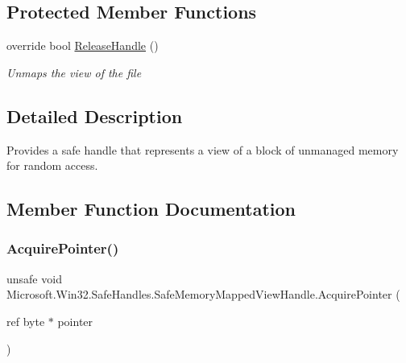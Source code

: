 \subsection*{Protected Member Functions}
\begin{DoxyCompactItemize}
\item 
override bool \hyperlink{class_microsoft_1_1_win32_1_1_safe_handles_1_1_safe_memory_mapped_view_handle_a4d7e8275a79d38c77c9d57d24a6b6be4}{Release\+Handle} ()
\begin{DoxyCompactList}\small\item\em Unmap\textquotesingle{}s the view of the file \end{DoxyCompactList}\end{DoxyCompactItemize}


\subsection{Detailed Description}
Provides a safe handle that represents a view of a block of unmanaged memory for random access. 



\subsection{Member Function Documentation}
\mbox{\label{class_microsoft_1_1_win32_1_1_safe_handles_1_1_safe_memory_mapped_view_handle_a1f6fb93194f18b330b5aa072c6c38e71}} 
\subsubsection{\texorpdfstring{Acquire\+Pointer()}{AcquirePointer()}}
{\footnotesize\ttfamily unsafe void Microsoft.\+Win32.\+Safe\+Handles.\+Safe\+Memory\+Mapped\+View\+Handle.\+Acquire\+Pointer (\begin{DoxyParamCaption}\item[{ref byte $\ast$}]{pointer }\end{DoxyParamCaption})\hspace{0.3cm}{\ttfamily [inline]}}



